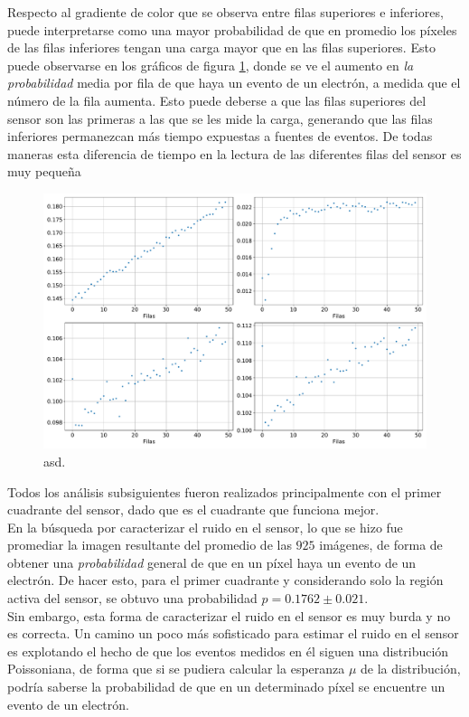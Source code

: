Respecto al gradiente de color que se observa entre filas superiores e inferiores, puede interpretarse como una mayor probabilidad de que en promedio los píxeles de las filas inferiores tengan una carga mayor que en las filas superiores. Esto puede observarse en los gráficos de figura \ref{fig:GradienteProb}, donde se ve el aumento en \textit{la probabilidad} media por fila de que haya un evento de un electrón, a medida que el número de la fila aumenta. Esto puede deberse a que las filas superiores del sensor son las primeras a las que se les mide la carga, generando que las filas inferiores permanezcan más tiempo expuestas a fuentes de eventos. De todas maneras esta diferencia de tiempo en la lectura de las diferentes filas del sensor es muy pequeña
\begin{figure}[H]
    \centering
    \includegraphics[scale=0.45]{Figs/Gradiente_en_filas_sensor.pdf}
    \caption{\footnotesize{asd.}}
    \label{fig:GradienteProb}
\end{figure}
Todos los análisis subsiguientes fueron realizados principalmente con el primer cuadrante del sensor, dado que es el cuadrante que funciona mejor.\\
\indent En la búsqueda por caracterizar el ruido en el sensor, lo que se hizo fue promediar la imagen resultante del promedio de las $925$ imágenes, de forma de obtener una \textit{probabilidad} general de que en un píxel haya un evento de un electrón. De hacer esto, para el primer cuadrante y considerando solo la región activa del sensor, se obtuvo una probabilidad $p = 0.1762 \pm 0.021$.\\
\indent Sin embargo, esta forma de caracterizar el ruido en el sensor es muy burda y no es correcta. Un camino un poco más sofisticado para estimar el ruido en el sensor es explotando el hecho de que los eventos medidos en él siguen una distribución Poissoniana, de forma que si se pudiera calcular la esperanza $\mu$ de la distribución, podría saberse la probabilidad de que en un determinado píxel se encuentre un evento de un electrón.\\

